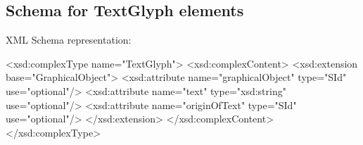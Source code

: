\subsection{Schema for TextGlyph elements}


XML Schema representation:

\begin{example}
<xsd:complexType name="TextGlyph">
 <xsd:complexContent>
  <xsd:extension base="GraphicalObject">
   <xsd:attribute name="graphicalObject" type="SId" use="optional"/>
   <xsd:attribute name="text" type="xsd:string" use="optional"/>
   <xsd:attribute name="originOfText" type="SId" use="optional"/>
  </xsd:extension>
 </xsd:complexContent>
</xsd:complexType>
\end{example}


